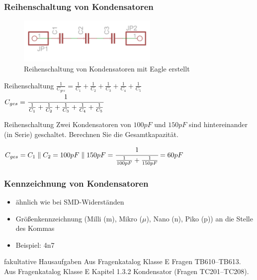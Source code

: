 \begin{frame}
  \frametitle{Reihenschaltung von Kondensatoren}
  \begin{center}
    \begin{figure}
      \includegraphics[width=0.6\textwidth,height=.5\textheight,keepaspectratio]{e05/c-reihe.png}
      \caption{Reihenschaltung von Kondensatoren {\tiny mit Eagle erstellt}}
    \end{figure}
  \end{center}
  \begin{block}{Reihenschaltung}
    $\frac{1}{C_{ges}} = \frac{1}{C_1} + \frac{1}{C_2} + \frac{1}{C_3} + \frac{1}{C_4} + \frac{1}{C_5}$\\
    $C_{ges} = \cfrac{1}{\frac{1}{C_1} + \frac{1}{C_2} + \frac{1}{C_3} + \frac{1}{C_4} + \frac{1}{C_5}}$
  \end{block}
\end{frame}

\begin{frame}
  \begin{exampleblock}{Reihenschaltung}
    Zwei Kondensatoren von $100 pF$ und $150 pF$ sind hintereinander (in Serie) geschaltet. Berechnen Sie die Gesamtkapazität.
  \end{exampleblock}
  \pause
  \begin{center}
    $C_{ges} = C_1 \parallel C_2 = 100 pF \parallel 150 pF = \cfrac{1}{\frac{1}{100 pF} + \frac{1}{150 pF}} = 60 pF$
  \end{center}
\end{frame}

\begin{frame}
  \frametitle{Kennzeichnung von Kondensatoren}
  \begin{itemize}
    \item ähnlich wie bei SMD-Widerständen
    \item Größenkennzeichnung (Milli (m), Mikro ($\mu$), Nano (n), Piko (p)) an die Stelle des Kommas
    \item Beispiel: 4n7
  \end{itemize}
\end{frame}

\begin{frame}
  \begin{alertblock}{fakultative Hausaufgaben}
    Aus Fragenkatalog Klasse E Fragen TB610--TB613.\\
    Aus Fragenkatalog Klasse E Kapitel 1.3.2 Kondensator (Fragen TC201--TC208).
  \end{alertblock}
\end{frame}



